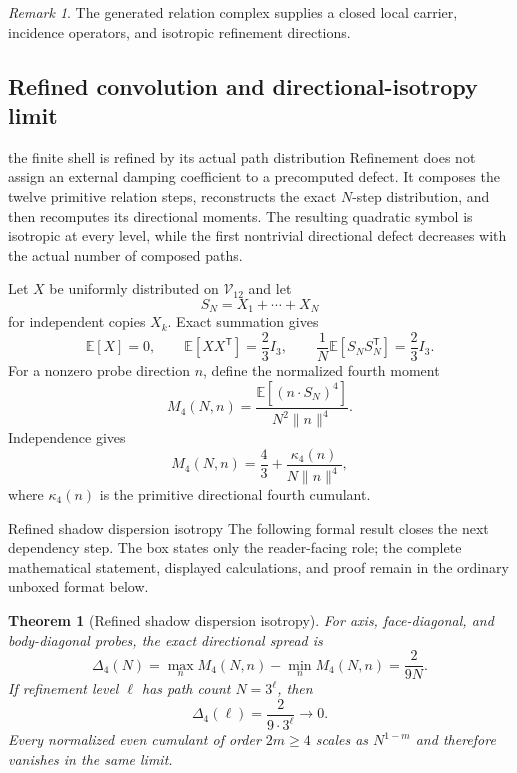 \documentclass[11pt]{article}
\numberwithin{equation}{section}
\newtheorem{theorem}[definition]{Theorem}
\theoremstyle{remark}
\newtheorem{remark}[definition]{Remark}
\begin{document}
\begin{remark}
The generated relation complex supplies a closed local carrier, incidence operators, and isotropic refinement directions.
\end{remark}


\subsection{Refined convolution and directional-isotropy limit}
\begin{interpretivebridge}{the finite shell is refined by its actual path distribution}
Refinement does not assign an external damping coefficient to a precomputed defect. It composes the twelve primitive relation steps, reconstructs the exact $N$-step distribution, and then recomputes its directional moments. The resulting quadratic symbol is isotropic at every level, while the first nontrivial directional defect decreases with the actual number of composed paths.
\end{interpretivebridge}

Let $X$ be uniformly distributed on $\mathcal V_{12}$ and let
\begin{equation}
S_N=X_1+\cdots+X_N
\end{equation}
for independent copies $X_k$. Exact summation gives
\begin{equation}
\mathbb E[X]=0,
\qquad
\mathbb E[XX^{\mathsf T}]=\frac23 I_3,
\qquad
\frac1N\mathbb E[S_NS_N^{\mathsf T}]=\frac23 I_3.
\label{eq:js-covariance}
\end{equation}
For a nonzero probe direction $n$, define the normalized fourth moment
\begin{equation}
M_4(N,n)=\frac{\mathbb E[(n\cdot S_N)^4]}{N^2\|n\|^4}.
\end{equation}
Independence gives
\begin{equation}
M_4(N,n)=\frac43+\frac{\kappa_4(n)}{N\|n\|^4},
\label{eq:fourth-cumulant-law}
\end{equation}
where $\kappa_4(n)$ is the primitive directional fourth cumulant.

\begin{proofguide}{Refined shadow dispersion isotropy}
The following formal result closes the next dependency step. The box states only the reader-facing role; the complete mathematical statement, displayed calculations, and proof remain in the ordinary unboxed format below.
\end{proofguide}
\begin{theorem}[Refined shadow dispersion isotropy]
For axis, face-diagonal, and body-diagonal probes, the exact directional spread is
\begin{equation}
\Delta_4(N)
=\max_n M_4(N,n)-\min_n M_4(N,n)
=\frac{2}{9N}.
\label{eq:anisotropy-spread}
\end{equation}
If refinement level $\ell$ has path count $N=3^\ell$, then
\begin{equation}
\Delta_4(\ell)=\frac{2}{9\cdot3^\ell}\longrightarrow0.
\end{equation}
Every normalized even cumulant of order $2m\ge4$ scales as $N^{1-m}$ and therefore vanishes in the same limit.
\end{theorem}
\end{document}
